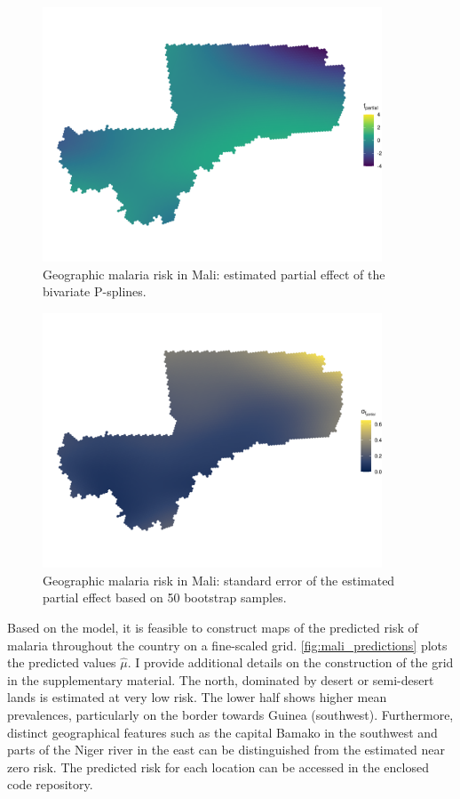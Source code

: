 \begin{figure}[!th]
	\centering
	\includegraphics[width=0.9\textwidth, keepaspectratio]{figures/mali_spatialeffect.png}
	\caption{Geographic malaria risk in Mali: estimated partial effect of the bivariate P-splines.}
	\label{fig:mali_spatialeffect}
\end{figure}

\begin{figure}[!th]
	\centering
	\includegraphics[width=0.9\textwidth, keepaspectratio]{figures/mali_spatialeffectuncertainty.png}
	\caption{Geographic malaria risk in Mali: standard error of the estimated partial effect based on 50 bootstrap samples.}
	\label{fig:mali_spatialeffectuncertainty}
\end{figure}

Based on the model, it is feasible to construct maps of the predicted risk of malaria throughout the country on a fine-scaled grid. \autoref{fig:mali_predictions} plots the predicted values $\hat{\mu}$. I provide additional details on the construction of the grid in the supplementary material. The north, dominated by desert or semi-desert lands is estimated at very low risk. The lower half shows higher mean prevalences, particularly on the border towards Guinea (southwest). Furthermore, distinct geographical features such as the capital Bamako in the southwest and parts of the Niger river in the east can be distinguished from the estimated near zero risk. The predicted risk for each location can be accessed in the enclosed code repository. 

